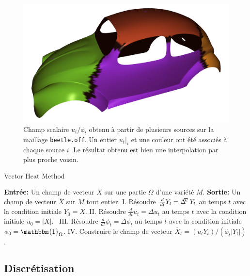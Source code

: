 \documentclass[11pt]{article}
\DeclareMathOperator{\connexionLaplacian}{\Delta^{\hspace{-3pt} \nabla}}
\begin{document}
	\begin{figure}
		\centering
		\includegraphics[width=12cm]{voronoi_car.png}
		\caption{Champ scalaire $u_t / \phi_t$ obtenu à partir de plusieurs sources sur la maillage \texttt{beetle.off}. Un entier $u_t|_i$ et une couleur ont été associés à chaque source $i$. Le résultat obtenu est bien une interpolation par plus proche voisin.}
		\label{fig:voronoi}
	\end{figure}
	
	\begin{algorithm}[h]
		\caption{Vector Heat Method}
		\label{alg:VHM}
		\begin{algorithmic}
			\State \textbf{Entrée:} Un champ de vecteur $X$ sur une partie $\Omega$ d'une variété $M$.
			\State \textbf{Sortie:} Un champ de vecteur $\bar{X}$ sur $M$ tout entier.
			\State \hspace{10pt} I. \; Résoudre $\frac{d}{dt} Y_t = \connexionLaplacian Y_t$ au temps $t$ avec la condition initiale $Y_0 = X$.
			\State \hspace{6pt} II. \; Résoudre $\frac{d}{dt} u_t = \Delta u_t$ au temps $t$ avec la condition initiale $u_0 = |X|$.
			\State \, III. \; Résoudre $\frac{d}{dt} \phi_t = \Delta \phi_t$ au temps $t$ avec la condition initiale $\phi_0 = \mathbbm{1}_\Omega$.
			\State \hspace{3pt} IV. \; Construire le champ de vecteur $\bar{X}_t = ( u_t Y_t) / (\phi_t |Y_t|)$.
		\end{algorithmic}
	\end{algorithm}

	\subsection{Discrétisation}
	
\end{document}
